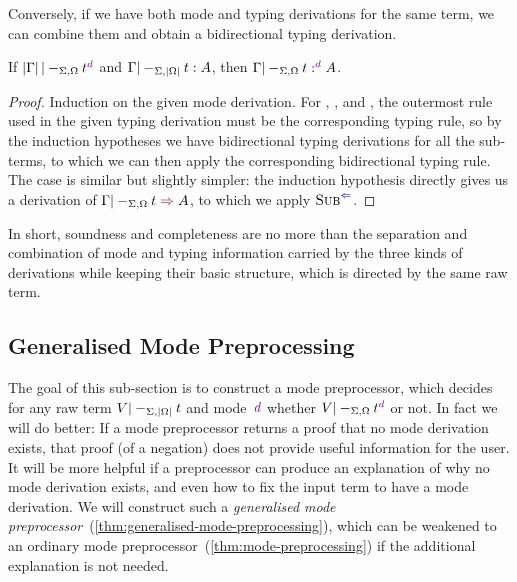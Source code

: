 Conversely, if we have both mode and typing derivations for the same term, we can combine them and obtain a bidirectional typing derivation.

\begin{lemma}[Completeness]\label{thm:completeness}
If\/ $\erase\Gamma |-_{\Sigma, \Omega} t^\dir{d}$ and\/ $\Gamma |-_{\Sigma, \left|\Omega\right|} t : A$, then $\Gamma |-_{\Sigma, \Omega} t :^\dir{d} A$.
\end{lemma}

\begin{proof}
Induction on the given mode derivation.
For , , and , the outermost rule used in the given typing derivation must be the corresponding typing rule, so by the induction hypotheses we have bidirectional typing derivations for all the sub-terms, to which we can then apply the corresponding bidirectional typing rule.
The  case is similar but slightly simpler: the induction hypothesis directly gives us a derivation of $\Gamma |-_{\Sigma,\Omega} t \syn A$, to which we apply $\ChkRule{Sub}$.
\end{proof}

In short, soundness and completeness are no more than the separation and combination of mode and typing information carried by the three kinds of derivations while keeping their basic structure, which is directed by the same raw term.

\subsection{Generalised Mode Preprocessing}
\label{sec:mode-preprocessing}

The goal of this sub-section is to construct a mode preprocessor, which decides for any raw term $V |-_{\Sigma,\left|\Omega\right|} t$ and mode~$\dir d$ whether $V |-_{\Sigma,\Omega} t^\dir{d}$ or not.
In fact we will do better:
If a mode preprocessor returns a proof that no mode derivation exists, that proof (of a negation) does not provide useful information for the user.
It will be more helpful if a preprocessor can produce an explanation of why no mode derivation exists, and even how to fix the input term to have a mode derivation.
We will construct such a \emph{generalised mode preprocessor}~(\cref{thm:generalised-mode-preprocessing}), which can be weakened to an ordinary mode preprocessor~(\cref{thm:mode-preprocessing}) if the additional explanation is not needed.

